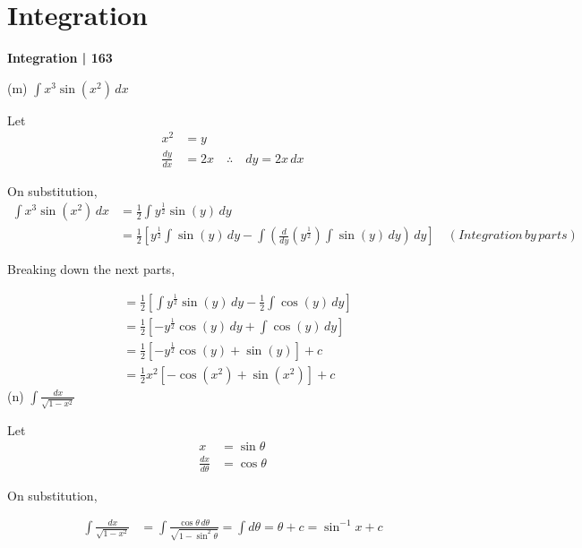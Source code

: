 \documentclass{article}
\begin{document}
\section*{Integration}
\textbf{Integration | 163}

(m) \( \int x^3 \sin(x^2) \, dx \)

Let
\[
\begin{align*}
x^2 & = y \\
\frac{dy}{dx} & = 2x \quad \therefore \quad dy = 2x \, dx 
\end{align*}
\]

On substitution,
\[
\begin{align*}
\int x^3 \sin(x^2) \, dx & = \frac{1}{2} \int y^{\frac{1}{2}} \sin(y) \, dy \\
 & = \frac{1}{2} \left[ y^{\frac{1}{2}} \int \sin(y) \, dy - \int \left( \frac{d}{dy}\left( y^{\frac{1}{2}} \right) \int \sin(y) \, dy \right) \, dy \right]  \quad (Integration\, by\, parts)
\end{align*}
\]

Breaking down the next parts,

\[
\begin{align*}
 & = \frac{1}{2} \left[ \int y^{\frac{1}{2}} \sin(y) \, dy - \frac{1}{2} \int \cos(y) \, dy \right] \\
 & = \frac{1}{2} \left[ - y^{\frac{1}{2}} \cos(y) \, dy + \int \cos(y) \, dy \right] \\
 & = \frac{1}{2} \left[ - y^{\frac{1}{2}} \cos(y) + \sin(y) \right] + c \\
 & = \frac{1}{2} x^2 \left[ - \cos(x^2) + \sin(x^2) \right] + c
\end{align*}
\]
(n) \( \int \frac{dx}{\sqrt{1-x^2}} \)

Let
\[
\begin{align*}
x & = \sin \theta \\
\frac{dx}{d\theta} & = \cos \theta 
\end{align*}
\]

On substitution,

\[
\begin{align*}
\int \frac{dx}{\sqrt{1-x^2}} & = \int \frac{\cos \theta \, d\theta}{\sqrt{1-\sin^2\theta}} = \int d\theta = \theta + c = \sin^{-1}x + c
\end{align*}
\]

\end{document}
